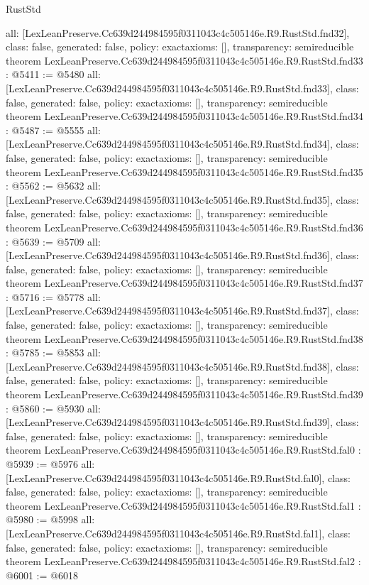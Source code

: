 \begin{lexlean}{RustStd}
\begin{coremodule}
{  all: [LexLeanPreserve.Cc639d244984595f0311043c4c505146e.R9.RustStd.fnd32],
  class: false,
  generated: false,
  policy: exact{axioms: []},
  transparency: semireducible
}
theorem LexLeanPreserve.Cc639d244984595f0311043c4c505146e.R9.RustStd.fnd33 : @5411 := @5480 {
  all: [LexLeanPreserve.Cc639d244984595f0311043c4c505146e.R9.RustStd.fnd33],
  class: false,
  generated: false,
  policy: exact{axioms: []},
  transparency: semireducible
}
theorem LexLeanPreserve.Cc639d244984595f0311043c4c505146e.R9.RustStd.fnd34 : @5487 := @5555 {
  all: [LexLeanPreserve.Cc639d244984595f0311043c4c505146e.R9.RustStd.fnd34],
  class: false,
  generated: false,
  policy: exact{axioms: []},
  transparency: semireducible
}
theorem LexLeanPreserve.Cc639d244984595f0311043c4c505146e.R9.RustStd.fnd35 : @5562 := @5632 {
  all: [LexLeanPreserve.Cc639d244984595f0311043c4c505146e.R9.RustStd.fnd35],
  class: false,
  generated: false,
  policy: exact{axioms: []},
  transparency: semireducible
}
theorem LexLeanPreserve.Cc639d244984595f0311043c4c505146e.R9.RustStd.fnd36 : @5639 := @5709 {
  all: [LexLeanPreserve.Cc639d244984595f0311043c4c505146e.R9.RustStd.fnd36],
  class: false,
  generated: false,
  policy: exact{axioms: []},
  transparency: semireducible
}
theorem LexLeanPreserve.Cc639d244984595f0311043c4c505146e.R9.RustStd.fnd37 : @5716 := @5778 {
  all: [LexLeanPreserve.Cc639d244984595f0311043c4c505146e.R9.RustStd.fnd37],
  class: false,
  generated: false,
  policy: exact{axioms: []},
  transparency: semireducible
}
theorem LexLeanPreserve.Cc639d244984595f0311043c4c505146e.R9.RustStd.fnd38 : @5785 := @5853 {
  all: [LexLeanPreserve.Cc639d244984595f0311043c4c505146e.R9.RustStd.fnd38],
  class: false,
  generated: false,
  policy: exact{axioms: []},
  transparency: semireducible
}
theorem LexLeanPreserve.Cc639d244984595f0311043c4c505146e.R9.RustStd.fnd39 : @5860 := @5930 {
  all: [LexLeanPreserve.Cc639d244984595f0311043c4c505146e.R9.RustStd.fnd39],
  class: false,
  generated: false,
  policy: exact{axioms: []},
  transparency: semireducible
}
theorem LexLeanPreserve.Cc639d244984595f0311043c4c505146e.R9.RustStd.fal0 : @5939 := @5976 {
  all: [LexLeanPreserve.Cc639d244984595f0311043c4c505146e.R9.RustStd.fal0],
  class: false,
  generated: false,
  policy: exact{axioms: []},
  transparency: semireducible
}
theorem LexLeanPreserve.Cc639d244984595f0311043c4c505146e.R9.RustStd.fal1 : @5980 := @5998 {
  all: [LexLeanPreserve.Cc639d244984595f0311043c4c505146e.R9.RustStd.fal1],
  class: false,
  generated: false,
  policy: exact{axioms: []},
  transparency: semireducible
}
theorem LexLeanPreserve.Cc639d244984595f0311043c4c505146e.R9.RustStd.fal2 : @6001 := @6018 {
}
\end{coremodule}
\end{lexlean}
